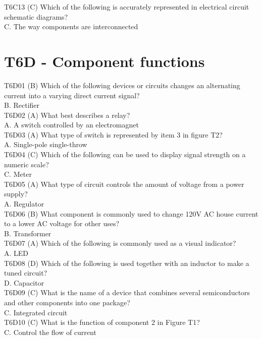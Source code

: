 \documentclass[12pt,letterpaper]{report}
\begin{document}
T6C13 (C) Which of the following is accurately represented in electrical circuit schematic diagrams?\\
C. The way components are interconnected\\

\section{T6D - Component functions}

T6D01 (B) Which of the following devices or circuits changes an alternating current into a varying direct current signal?\\
B. Rectifier\\

T6D02 (A) What best describes a relay?\\
A. A switch controlled by an electromagnet\\

T6D03 (A) What type of switch is represented by item 3 in figure T2?\\
A. Single-pole single-throw\\

T6D04 (C) Which of the following can be used to display signal strength on a numeric scale?\\
C. Meter\\

T6D05 (A) What type of circuit controls the amount of voltage from a power supply?\\
A. Regulator\\

T6D06 (B) What component is commonly used to change 120V AC house current to a lower AC voltage for other uses?\\
B. Transformer\\

T6D07 (A) Which of the following is commonly used as a visual indicator?\\
A. LED\\

T6D08 (D) Which of the following is used together with an inductor to make a tuned circuit?\\
D. Capacitor\\

T6D09 (C) What is the name of a device that combines several semiconductors and other components into one package?\\
C. Integrated circuit\\

T6D10 (C) What is the function of component 2 in Figure T1?\\
C. Control the flow of current\\
\end{document}
